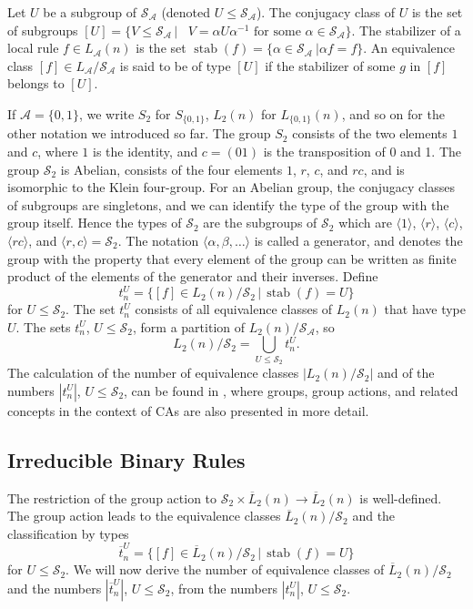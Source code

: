 \documentclass[a4paper]{article}
\newcommand{\stab}{\mathop{\mathrm{stab}}\nolimits}
\begin{document}
Let $U$ be a subgroup of $\mathcal{S}_\mathcal{A}$ (denoted $U \le \mathcal{S}_\mathcal{A}$).
The conjugacy class of $U$ is the set of subgroups
$[U] = \{ V \le \mathcal{S}_\mathcal{A} \, | \, \mbox{ $V = \alpha U \alpha^{-1}$ for some $\alpha \in \mathcal{S}_\mathcal{A}$} \}$.
The stabilizer of a local rule $f \in L_\mathcal{A}(n)$ is the set
$\stab(f) = \{ \alpha \in \mathcal{S}_\mathcal{A} \ | \alpha f = f \}$.
An equivalence class $[f] \in L_\mathcal{A} / \mathcal{S}_\mathcal{A}$ is said to be of
type $[U]$ if the stabilizer of some $g$ in $[f]$ belongs to $[U]$.

If $\mathcal{A} = \{0,1\}$, we write $S_2$ for $S_{\{0,1\}}$, $L_2(n)$ for $L_{\{0,1\}}(n)$, and so on for the other notation
we introduced so far.
The group $S_2$ consists of the two elements $1$ and $c$, where $1$ is the identity, and $c = (01)$ is the transposition of
0 and 1.
The group $\mathcal{S}_2$ is Abelian, consists of the four elements $1$, $r$, $c$, and $rc$, and is isomorphic to the Klein four-group.
For an Abelian group, the conjugacy classes of subgroups are singletons, and we can identify the type of the group with
the group itself.
Hence the types of $\mathcal{S}_2$ are the subgroups of $\mathcal{S}_2$ which are $\langle 1 \rangle$, $\langle r \rangle$, $\langle c \rangle$,
$\langle rc \rangle$, and $\langle r, c \rangle = \mathcal{S}_2$.
The notation $\langle \alpha, \beta, \ldots \rangle$ is called a generator, and denotes the group with
the property that every element of the group can be written as finite
product of the elements of the generator and their inverses.
Define
\[
t^U_n = \{ [f] \in L_2(n) / \mathcal{S}_2 \, | \, \stab(f) = U \}
\]
for $U \le \mathcal{S}_2$.
The set $t^U_n$ consists of all equivalence classes of $L_2(n)$ that have type $U$.
The sets $t^U_n$, $U \le \mathcal{S}_2$, form a partition of $L_2(n) / \mathcal{S}_\mathcal{A}$, so
\[
L_2(n) / \mathcal{S}_2 = \bigcup_{U \le \mathcal{S}_2} t^U_n.
\]
The calculation of the number of equivalence classes
$|L_2(n) / \mathcal{S}_2|$ and of the numbers $|t^U_n|$, $U \le \mathcal{S}_2$,
can be found in \cite{SCHALLER2025100298}, where groups, group actions, and related concepts in the context of CAs
are also presented in more detail.


\subsection{Irreducible Binary Rules}

The restriction of the group action to
$\mathcal{S}_2 \times \overline{L}_2(n) \to \overline{L}_2(n)$ is well-defined.
The group action leads to the equivalence classes $\overline{L}_2(n) / \mathcal{S}_2$
and the classification by types
\[
\overline{t}^U_n = \{ [f] \in \overline{L}_2(n) / \mathcal{S}_2 \, | \, \stab(f) = U \}
\]
 for $U \le \mathcal{S}_2$.
We will now derive the number of equivalence classes of $\overline{L}_2(n) / \mathcal{S}_2$ and the numbers
$|\overline{t}^U_n|$, $U \le \mathcal{S}_2$,
from the numbers $|t^U_n|$, $U \le \mathcal{S}_2$.
\end{document}
